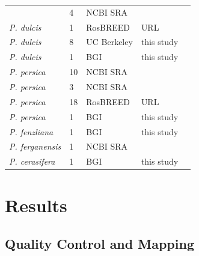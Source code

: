 \documentclass[12pt]{article}
\begin{document}
\begin{center}
\begin{longtable}{lllll}
{                 %
                  \emph{P. dulcis} &4 &NCBI SRA &\citealt{koepke2013comparative}\\
                  \emph{P. dulcis} &1 &RosBREED &URL\\
                  \emph{P. dulcis} &8 &UC Berkeley &this study \\
                  \emph{P. dulcis} &1 &BGI &this study\\
                  \emph{P. persica} &10 &NCBI SRA &\citealt{verde2013high} \\ %
                  \emph{P. persica} &3 &NCBI SRA &\citealt{ahmad2011whole} \\ %
                  \emph{P. persica} &18 &RosBREED &URL \\ %
                  \emph{P. persica} &1 &BGI &this study \\ %
                 \emph{P. fenzliana} &1 &BGI &this study\\
                 \emph{P. ferganensis} &1 &NCBI SRA &\citealt{verde2013high}\\
                 \emph{P. cerasifera} &1 &BGI &this study\\ \hline

\end{longtable}
\end{center}



\section*{Results}
\subsection*{Quality Control and Mapping}\\
\end{document}
